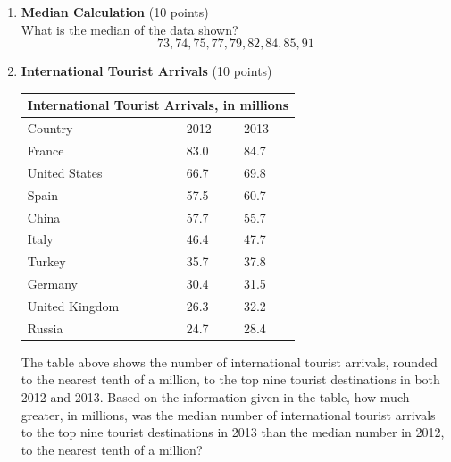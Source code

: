 \begin{enumerate}
  \newpage

  \item \textbf{Median Calculation} (10 points)\\
  What is the median of the data shown?\\
  $$73,74,75,77,79,82,84,85,91$$
  \begin{subanswer}
  \end{subanswer}

  \item \textbf{International Tourist Arrivals} (10 points)\\
  \begin{center}
  \begin{tabular}{|l|l|l|}
  \hline
  \multicolumn{3}{|c|}{International Tourist Arrivals, in millions} \\
  \hline
  Country & 2012 & 2013 \\
  \hline
  France & 83.0 & 84.7 \\
  \hline
  United States & 66.7 & 69.8 \\
  \hline
  Spain & 57.5 & 60.7 \\
  \hline
  China & 57.7 & 55.7 \\
  \hline
  Italy & 46.4 & 47.7 \\
  \hline
  Turkey & 35.7 & 37.8 \\
  \hline
  Germany & 30.4 & 31.5 \\
  \hline
  United Kingdom & 26.3 & 32.2 \\
  \hline
  Russia & 24.7 & 28.4 \\
  \hline
  \end{tabular}
  \end{center}

  The table above shows the number of international tourist arrivals, rounded to the nearest tenth of a million, to the top nine tourist destinations in both 2012 and 2013. Based on the information given in the table, how much greater, in millions, was the median number of international tourist arrivals to the top nine tourist destinations in 2013 than the median number in 2012, to the nearest tenth of a million?
  \begin{subanswer}
  \end{subanswer}


  \newpage


\end{enumerate}
